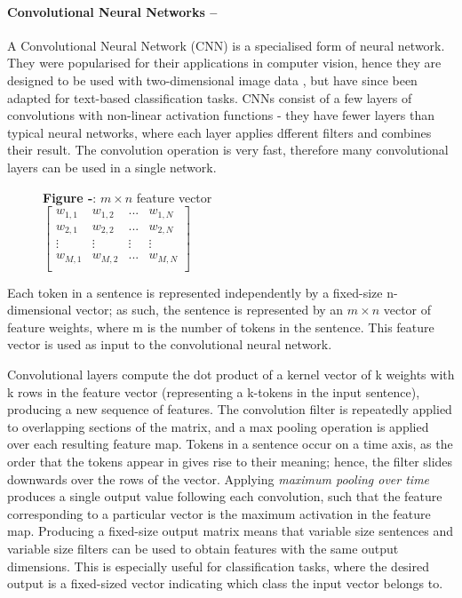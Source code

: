 \documentclass[12pt,a4paper]{article}
\begin{document}
\paragraph{Convolutional Neural Networks --}
A Convolutional Neural Network (CNN)\cite{lecun1998gradient} is a specialised form of neural network. They were popularised for their applications in computer vision, hence they are designed to be used with two-dimensional image data \cite{krizhevsky2012imagenet}, but have since been adapted for text-based classification tasks. CNNs consist of a few layers of convolutions with non-linear activation functions - they have fewer layers than typical neural networks, where each layer applies dfferent filters and combines their result. The convolution operation is very fast, therefore many convolutional layers can be used in a single network.

\begin{minipage}{0.35\textwidth}
	\begin{figure}[H]
		\begin{center}
		\textbf{Figure -}: $m \times n$ feature vector\\
		$
		\begin{bmatrix}
		w_{1,1} & w_{1,2} & ... & w_{1,N}\\
		w_{2, 1} & w_{2, 2} & ... & w_{2, N} \\
		\vdots & \vdots & \vdots & \vdots \\
		w_{M, 1} & w_{M, 2} & ... & w_{M, N} \\
		\end{bmatrix}
		$
	\end{center}
	\end{figure}
\end{minipage} \hfill
\begin{minipage}{0.6\textwidth}
	Each token in a sentence is represented independently by a fixed-size n-dimensional vector; as such, the sentence is represented by an $m \times n$ vector of feature weights, where m is the number of tokens in the sentence. This feature vector is used as input to the convolutional neural network. 
\end{minipage}

Convolutional layers compute the dot product of a kernel vector of k weights with k rows in the feature vector (representing a k-tokens in the input sentence), producing a new sequence of features. The convolution filter is repeatedly applied to overlapping sections of the matrix, and a max pooling operation is applied over each resulting feature map. Tokens in a sentence occur on a time axis, as the order that the tokens appear in gives rise to their meaning; hence, the filter slides downwards over the rows of the vector. Applying \textit{maximum pooling over time} produces a single output value following each convolution, such that the feature corresponding to a particular vector is the maximum activation in the feature map. Producing a fixed-size output matrix means that variable size sentences and variable size filters can be used to obtain features with the same output dimensions. This is especially useful for classification tasks, where the desired output is a fixed-sized vector indicating which class the input vector belongs to.
\end{document}
